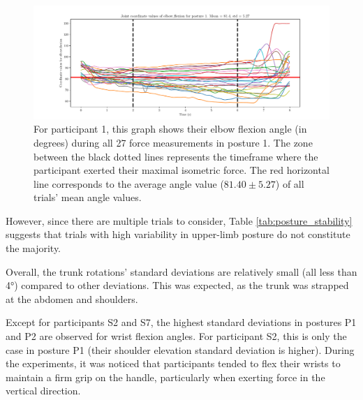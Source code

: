 \begin{figure}[!htb]
    \captionsetup{justification=centering}
        \centering
        \includegraphics[trim={80 0 80 0},clip,width=1\linewidth]{img/chapter_5/posture_1_elbow_flexion_489.pdf}
    \caption{For participant 1, this graph shows their elbow flexion angle (in degrees) during all 27 force measurements in posture 1. The zone between the black dotted lines represents the timeframe where the participant exerted their maximal isometric force. The red horizontal line corresponds to the average angle value ($81.40\pm 5.27$) of all trials' mean angle values.}
    \label{fig:example_pos_489_elbow_flexion}
\end{figure}

However, since there are multiple trials to consider, Table \ref{tab:posture_stability} suggests that trials with high variability in upper-limb posture do not constitute the majority.

Overall, the trunk rotations' standard deviations are relatively small (all less than 4°) compared to other deviations. This was expected, as the trunk was strapped at the abdomen and shoulders.

Except for participants S2 and S7, the highest standard deviations in postures P1 and P2 are observed for wrist flexion angles. For participant S2, this is only the case in posture P1 (their shoulder elevation standard deviation is higher). During the experiments, it was noticed that participants tended to flex their wrists to maintain a firm grip on the handle, particularly when exerting force in the vertical direction.

